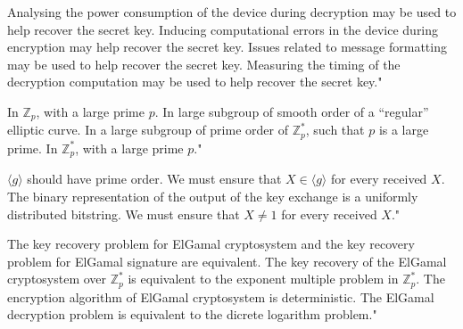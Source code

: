 {Analysing the power consumption of the device during decryption may be used to help recover the secret key.}
{Inducing computational errors in the device during encryption may help recover the secret key.}
{Issues related to message formatting may be used to help recover the secret key.}
{Measuring the timing of the decryption computation may be used to help recover the secret key."}

{In $\mathbb{Z}_p$, with a large prime $p$.}
{In large subgroup of smooth order of a ``regular'' elliptic curve.}
{In a large subgroup of prime order of $\mathbb{Z}_p^*$, such that $p$ is a large prime.}
{In $\mathbb{Z}_p^*$, with a large prime $p$."}

{$\langle g \rangle$ should have prime order.}
{We must ensure that $X\in \langle g \rangle$ for every received $X$.}
{The binary representation of the output of the key exchange is a uniformly distributed bitstring.}
{We must ensure that $X\neq1$ for every received $X$."}

{The key recovery problem for ElGamal cryptosystem and the key recovery problem for ElGamal signature are equivalent.}
{The key recovery of the ElGamal cryptosystem over $\mathbb{Z}_p^*$ is equivalent to the exponent multiple problem in $\mathbb{Z}_p^*$.}
{The encryption algorithm of ElGamal cryptosystem is deterministic.}
{The ElGamal decryption problem is equivalent to the dicrete logarithm problem."}

